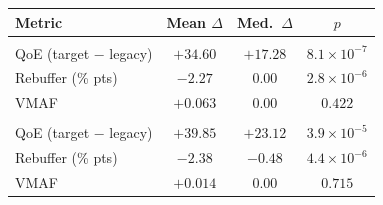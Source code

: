 \begin{tabularx}{\linewidth}{@{}>{\raggedright\arraybackslash}Xccc@{}}
\toprule
\textbf{Metric} & \textbf{Mean $\Delta$} & \textbf{Med.\ $\Delta$} & \textbf{$p$} \\
\midrule
\multicolumn{4}{@{}l}{\textit{\(\sigma_{\mathrm{soft}}{=}1.0,\ \tau{=}8\)}} \\
QoE (target $-$ legacy) & $+34.60$ & $+17.28$ & $8.1\times10^{-7}$ \\
Rebuffer (\% pts)       & $-2.27$  & $0.00$   & $2.8\times10^{-6}$ \\
VMAF                    & $+0.063$ & $0.00$   & $0.422$ \\
\midrule
\multicolumn{4}{@{}l}{\textit{\(\sigma_{\mathrm{soft}}{=}0.8,\ \tau{=}8\)}} \\
QoE (target $-$ legacy) & $+39.85$ & $+23.12$ & $3.9\times10^{-5}$ \\
Rebuffer (\% pts)       & $-2.38$  & $-0.48$  & $4.4\times10^{-6}$ \\
VMAF                    & $+0.014$ & $0.00$   & $0.715$ \\
\bottomrule
\end{tabularx}

